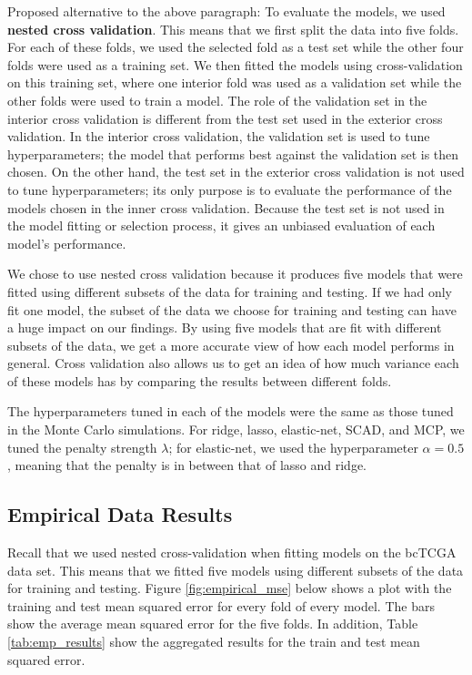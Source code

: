 \documentclass{article}
\begin{document}
Proposed alternative to the above paragraph: To evaluate the models, we used \textbf{nested cross validation}. This means that we first split the data into five folds. For each of these folds, we used the selected fold as a test set while the other four folds were used as a training set. We then fitted the models using cross-validation on this training set, where one interior fold was used as a validation set while the other folds were used to train a model. The role of the validation set in the interior cross validation is different from the test set used in the exterior cross validation. In the interior cross validation, the validation set is used to tune hyperparameters; the model that performs best against the validation set is then chosen. On the other hand, the test set in the exterior cross validation is not used to tune hyperparameters; its only purpose is to evaluate the performance of the models chosen in the inner cross validation. Because the test set is not used in the model fitting or selection process, it gives an unbiased evaluation of each model's performance.

We chose to use nested cross validation because it produces five models that were fitted using different subsets of the data for training and testing. If we had only fit one model, the subset of the data we choose for training and testing can have a huge impact on our findings. By using five models that are fit with different subsets of the data, we get a more accurate view of how each model performs in general. Cross validation also allows us to get an idea of how much variance each of these models has by comparing the results between different folds.

The hyperparameters tuned in each of the models were the same as those tuned in the Monte Carlo simulations. For ridge, lasso, elastic-net, SCAD, and MCP, we tuned the penalty strength $\lambda$; for elastic-net, we used the hyperparameter $\alpha = 0.5$, meaning that the penalty is in between that of lasso and ridge. 

\subsection{Empirical Data Results}
Recall that we used nested cross-validation when fitting models on the bcTCGA data set. This means that we fitted five models using different subsets of the data for training and testing. Figure \ref{fig:empirical_mse} below shows a plot with the training and test mean squared error for every fold of every model. The bars show the average mean squared error for the five folds. In addition, Table \ref{tab:emp_results} show the aggregated results for the train and test mean squared error.
\end{document}
